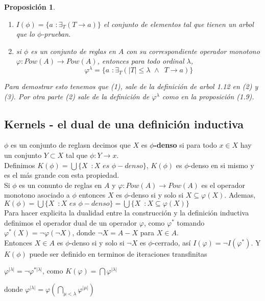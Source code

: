 \documentclass[executivepaper]{article}
\newtheorem{propo}{Proposición}[section]
\begin{document}
\begin{propo}
    \begin{enumerate}
        \item $I(\phi) = \{a\,\,:\exists_{T}(T\rightarrow a)\}$ el conjunto de elementos tal que tienen un arbol que lo $\phi$-prueban.
        \item si $\phi$ es un conjunto de reglas en $A$ con su correspondiente operador monotono $\varphi:Pow(A)\rightarrow Pow(A)$, entonces para todo ordinal $\lambda$,
        $$\varphi^{\lambda} = \{a\,\,:\exists_{T}(|T|\leq\lambda\,\,\land\,\,\,T\rightarrow a)\}$$
    \end{enumerate}

    Para demostrar esto tenemos que (1), sale de la definición de arbol 1.12 en (2) y (3). Por otra parte (2) sale de la definición de $\varphi^{\lambda}$ como en la proposición (1.9).
\end{propo}
\subsection{Kernels - el dual de una definición inductiva}
$\phi$ es un conjunto de reglasn decimos que $X$ es \textbf{$\phi$-denso} si para todo $x\in X$ hay un conjunto $Y\subset X$ tal que $\phi:Y\rightarrow x$.\\

Definimos $K(\phi) = \bigcup\{X\,\,\, : X \,\,es\,\,\phi-denso\}$, $K(\phi)$ es $\phi$-denso en si mismo  y es el más grande con esta propiedad.\\

Si $\phi$ es un conunto de reglas en $A$ y $\varphi:Pow(A)\rightarrow Pow(A)$ es el operador monotono asociado a $\phi$ entonces $X$ es $\phi$-denso si y solo si $X\subseteq \varphi(X)$.
Ademas, $K(\phi) = \bigcup\{X\,\,\, : X \,\,es\,\,\phi-denso\} = \bigcup\{X\,\,\, : X\subseteq \varphi(X)\}$\\

Para hacer explicita la dualidad entre la construcción y la definición inductiva definimos el operador dual de un operador $\varphi$, como $\varphi^{*}$ tomando $\varphi^{*}(X) = \neg\varphi(\neg X)$, donde $\neg X = A - X$ para $X\in A$.\\

Entonces $X\in A$ es $\phi$-denso si y solo si $\neg X$ es $\phi$-cerrado, así $I(\varphi) = \neg I(\varphi^{*})$. Y $K(\phi)$ puede ser definido en terminos de iteraciones transfinitas
\begin{center}
    $\varphi^{|\lambda|} = \neg\varphi^{*|\lambda|}$, como $K(\varphi) = \bigcap \varphi^{|\lambda|}$
\end{center}
donde $\varphi^{|\lambda|} = \varphi (\bigcap_{\mu<\lambda} \varphi^{|\mu|})$
\end{document}
